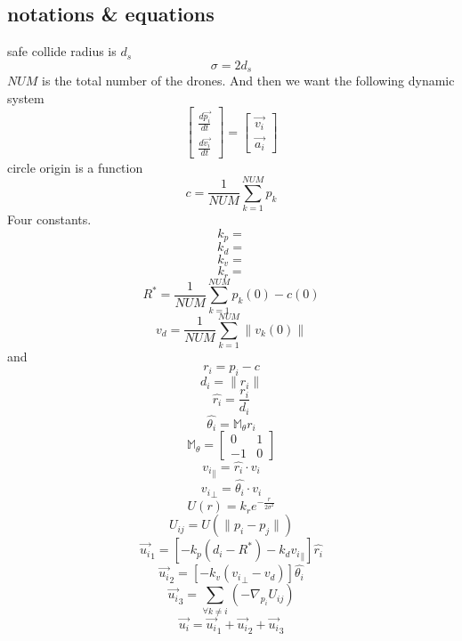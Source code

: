 \documentclass{article}
\theoremstyle{definition} %
\begin{document}
\subsection{notations \& equations}
safe collide radius is \(d_s\)
\[
    \sigma=2d_s
\]
\(NUM\) is the total number of the drones.
And then we want the following dynamic system
\[\begin{bmatrix}
        \frac{d\vec{p_i}}{dt} \\
        \frac{d\vec{v_i}}{dt}
    \end{bmatrix}=
    \begin{bmatrix}
        \vec{v_i} \\
        \vec{a_i}
    \end{bmatrix}
\]
circle origin is a function
\[
    c=\frac{1}{NUM}\sum_{k=1}^{NUM}p_k
\]
Four constants.
\[
    k_p=
\]
\[
    k_d=
\]
\[
    k_v=
\]
\[
    k_r=
\]
\[
    R^*=\frac{1}{NUM}\sum_{k=1}^{NUM}p_k(0)-c(0)
\]
\[
    v_d=\frac{1}{NUM}\sum_{k=1}^{NUM}\|v_k(0)\|
\]
and
\[
    r_i=p_i-c
\]
\[
    d_i=\|r_i\|
\]
\[
    \hat{r_i}=\frac{r_i}{d_i}
\]
\[
    \hat{\theta_i}=\mathbb{M}_\theta r_i
\]
\[
    \mathbb{M}_\theta=
    \begin{bmatrix}
        0  & 1 \\
        -1 & 0
    \end{bmatrix}
\]
\[
    {v_{i}}_{\parallel}=\hat{r_i}\cdot v_i
\]
\[
    {v_{i}}_{\perp}=\hat{\theta_i}\cdot v_i
\]
\[
    U(r)=k_re^{-\frac{r}{2\sigma^2}}
\]
\[
    U_{ij}=U(\|p_i-p_j\|)
\]
\[
    \vec{u_i}_1=[-k_p(d_i-R^*)-k_d{v_{i}}_{\parallel}]\hat{r_i}
\]
\[
    \vec{u_i}_2=[-k_v({v_{i}}_{\perp}-v_d)]\hat{\theta_i}
\]
\[
    \vec{u_i}_3=\sum_{\forall k\neq i}(-\nabla_{p_i}U_{ij})
\]
\[
    \vec{u_i}=\vec{u_i}_1+\vec{u_i}_2+\vec{u_i}_3
\]
\end{document}
